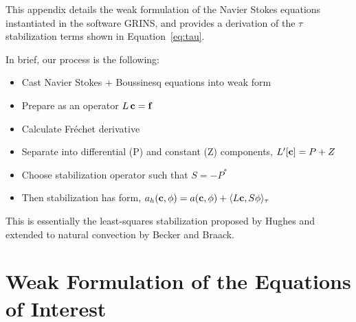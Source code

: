 \label{app:stab}

This appendix details the weak formulation of the Navier Stokes
equations instantiated in the software GRINS, and provides a
derivation of the $\tau$ stabilization terms shown in
Equation~\ref{eq:tau}.  

In brief, our process is the following: 

\begin{itemize}
 \item Cast Navier Stokes + Boussinesq equations into weak form
 \item Prepare as an operator $L\,{\bf c}={\bf f}$
 \item Calculate Fr\'echet derivative
 \item Separate into differential (P) and constant (Z) components,
       $L'[{\bf c}] = P + Z$
 \item Choose stabilization operator such that $S = -P^*$
 \item Then stabilization has form, $a_h({\bf c},{\bf \phi}) = a({\bf c},{\bf \phi}) + \langle
       L{\bf c},S{\bf \phi} \rangle_\tau$
\end{itemize}

This is essentially the least-squares stabilization proposed by Hughes
and extended to natural convection by Becker and Braack. 

%
%

\section{Weak Formulation of the Equations of Interest}

